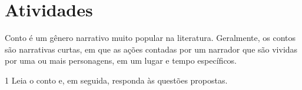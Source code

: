 \section*{Atividades}

Conto é um gênero narrativo muito popular na literatura. Geralmente, 
os contos são narrativas curtas, em que as ações contadas por um 
narrador que são vividas por uma ou mais personagens, em um lugar e 
tempo específicos.  


\num{1} Leia o conto e, em seguida, responda às questões propostas.


